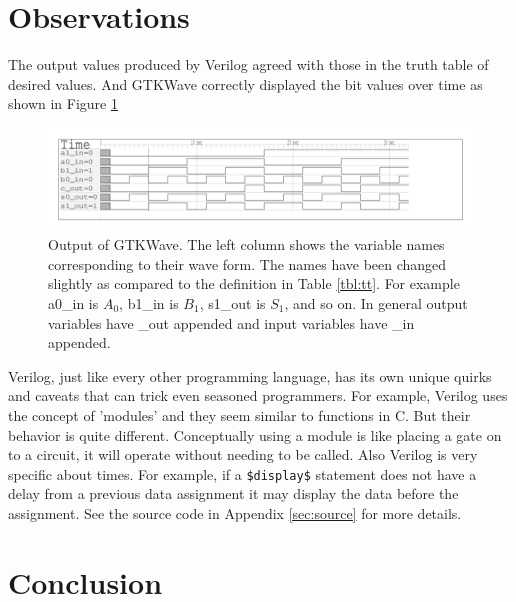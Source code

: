 \documentclass[12pt]{article}
\begin{document}

\section{Observations}

The output values produced by Verilog agreed with those in the
truth table of desired values.
And GTKWave correctly displayed the bit values over time
as shown in Figure \ref{fig:wave}

%

\begin{figure}
\center
\includegraphics[scale=0.7]{verilog/gtkwave-output}
\caption{Output of GTKWave.
The left column shows the variable names corresponding to their wave form.
The names have been changed slightly as compared to the definition in Table \ref{tbl:tt}.
For example a0\_in is $A_0$, b1\_in is $B_1$, s1\_out is $S_1$, and so on.
In general output variables have \_out appended and input variables have \_in appended.
}
\label{fig:wave}
\end{figure}

Verilog, just like every other programming language, has its own
unique quirks and caveats that can trick even seasoned programmers.
For example, Verilog uses the concept of 'modules' and they
seem similar to functions in C.
But their behavior is quite different.
Conceptually using a module is like placing a gate on to a circuit,
it will operate without needing to be called.
Also Verilog is very specific about times.
For example, if a \verb+$display$+ statement does not have a delay
from a previous data assignment it may display the data before the
assignment.
See the source code in Appendix \ref{sec:source} for more details.


\section{Conclusion}
\end{document}
